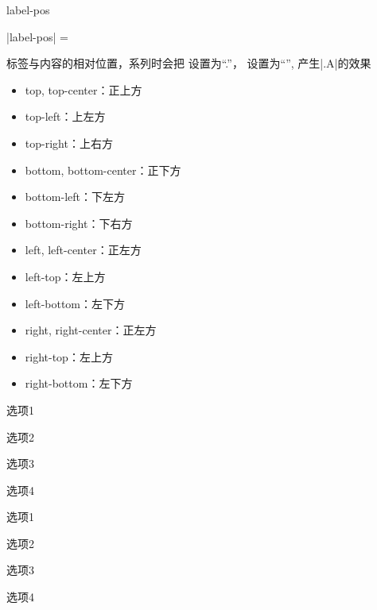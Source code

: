 \documentclass{xdyy-usermanual}
\begin{document}
\begin{function}{label-pos}
  \begin{syntax}
    |label-pos| =  
  \end{syntax}
  标签与内容的相对位置，系列时会把  设置为“.”， 设置为“{}”, 产生|.A|的效果
  \begin{itemize}
    \item top, top-center：正上方
    \item top-left：上左方
    \item top-right：上右方
    \item bottom, bottom-center：正下方
    \item bottom-left：下左方
    \item bottom-right：下右方
    \item left, left-center：正左方
    \item left-top：左上方
    \item left-bottom：左下方
    \item right, right-center：正左方
    \item right-top：左上方
    \item right-bottom：左下方
  \end{itemize}
\end{function}
\begin{vexample}
    \begin{xchoices}[label-pos = top]
      \item 选项1
      \item 选项2
      \item 选项3
      \item 选项4
    \end{xchoices}
\end{vexample}
\begin{vexample}
    \begin{xchoices}[label-pos = top-center]
      \item 选项1
      \item 选项2
      \item 选项3
      \item 选项4
    \end{xchoices}
\end{vexample}
\end{document}
